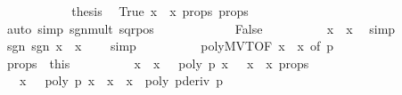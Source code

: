 \begin{isabellebody}
\ \ \ \ \ \ \ \ \isamarkupfalse%
\ \isamarkupfalse%
\ {\isacharquery}thesis\ \isamarkupfalse%
\ True\ {\isacharbackquoteopen}x\ {\isasymnoteq}\ x\ {\isasymepsilon}{\isacharunderscore}props\ {\isasymxi}{\isacharunderscore}props\isanewline
\ \ \ \ \ \ \ \ \ \ \ \ \isamarkupfalse%
\ {\isacharparenleft}auto\ simp{\isacharcolon}\ sgn{\isacharunderscore}mult\ sqr{\isacharunderscore}pos{\isacharparenright}\isanewline
\ \ \ \ \isamarkupfalse%
\isanewline
\ \ \ \ \ \ \isamarkupfalse%
\ False\isanewline
\ \ \ \ \ \ \ \ \isamarkupfalse%
\ {\isachardoublequoteopen}x\ {\isacharless}\ x\ \isamarkupfalse%
\ simp\isanewline
\ \ \ \ \ \ \ \ \isamarkupfalse%
\ sgn{\isacharcolon}\ {\isachardoublequoteopen}sgn\ {\isacharparenleft}x\ {\isacharminus}\ x\ {\isacharequal}\ {\isacharminus}{}{\isachardoublequoteclose}\ \isamarkupfalse%
\ simp\isanewline
\ \ \ \ \ \ \ \ \isamarkupfalse%
\ poly{\isacharunderscore}MVT{\isacharbrackleft}OF\ {\isacharbackquoteopen}x\ {\isacharless}\ x\ of\ p{\isacharbrackright}\ \isamarkupfalse%
\ {\isasymxi}\ \isacommand{{\isachardot}{\isachardot}}\isamarkupfalse%
\isanewline
\ \ \ \ \ \ \ \ \isamarkupfalse%
\ {\isasymxi}{\isacharunderscore}props\ {\isacharequal}\ this\isanewline
\ \ \ \ \ \ \ \ \isamarkupfalse%
\ {\isacharbackquoteopen}{\isasymbar}x\ {\isacharminus}\ x\ {\isacharless}\ {\isasymepsilon}{\isacharbackquoteclose}\ {\isacharbackquoteopen}poly\ p\ x\ {\isacharequal}\ {}{\isacharbackquoteclose}\ {\isacharbackquoteopen}x\ {\isacharless}\ x\ {\isasymepsilon}{\isacharunderscore}props\isanewline
\ \ \ \ \ \ \ \ \ \ \ \ \isamarkupfalse%
\ {\isachardoublequoteopen}{\isasymbar}{\isasymxi}\ {\isacharminus}\ x\ {\isacharless}\ {\isasymepsilon}{\isachardoublequoteclose}\ {\isachardoublequoteopen}poly\ p\ x\ {\isacharequal}\ {\isacharparenleft}x\ {\isacharminus}\ x\ {\isacharasterisk}\ poly\ {\isacharparenleft}pderiv\ p{\isacharparenright}\ {\isasymxi}{\isachardoublequoteclose}\ \isanewline

\end{isabellebody}

